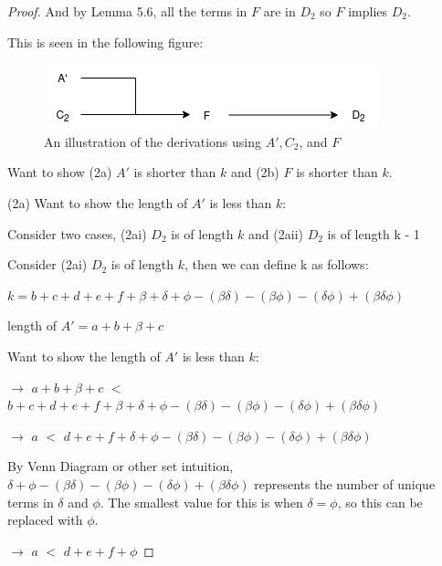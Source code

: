 \documentclass[manuscript]{acmart}
\begin{document}
\begin{proof}
        And by Lemma 5.6, all the terms in $F$ are in $D_2$ so $F$ implies $D_2$.

        This is seen in the following figure:

        \begin{figure}[h]
            \includegraphics[scale=0.8]{318c.png}
            \caption{An illustration of the derivations using $A', C_2$, and $F$}
        \end{figure}
        
        Want to show (2a) $A'$  is shorter than $k$ and (2b) $F$ is shorter than $k$.

        (2a) Want to show the length of $A'$ is less than $k$:

        Consider two cases, (2ai) $D_2$ is of length $k$ and 
        (2aii) $D_2$ is of length k - 1

        Consider (2ai) $D_2$ is of length $k$, then we can define k as follows:

        $k = b + c + d + e + f + \beta + \delta + \phi - (\beta \delta) 
        - (\beta \phi) - (\delta \phi) + (\beta \delta \phi)$

        length of $A' = a + b + \beta + c$

        Want to show the length of $A'$ is less than $k$:

        $\rightarrow$ $a + b + \beta + c$ $<$ $b + c + d + e + f + 
        \beta + \delta + \phi - (\beta \delta) 
        - (\beta \phi) - (\delta \phi) + (\beta \delta \phi)$

        $\rightarrow$ $a$ $<$ $d + e + f + \delta + \phi - (\beta \delta) 
        - (\beta \phi) - (\delta \phi) + (\beta \delta \phi)$

        By Venn Diagram or other set intuition, 
        $\delta + \phi - (\beta \delta) - (\beta \phi) - (\delta \phi) + 
        (\beta \delta \phi)$ represents the number of unique terms in 
        $\delta$ and $\phi$.
        The smallest value for this is when $\delta = \phi$, so this can
        be replaced with $\phi$.

        $\rightarrow$ $a$ $<$ $d + e + f + \phi$


\end{proof}
\end{document}

